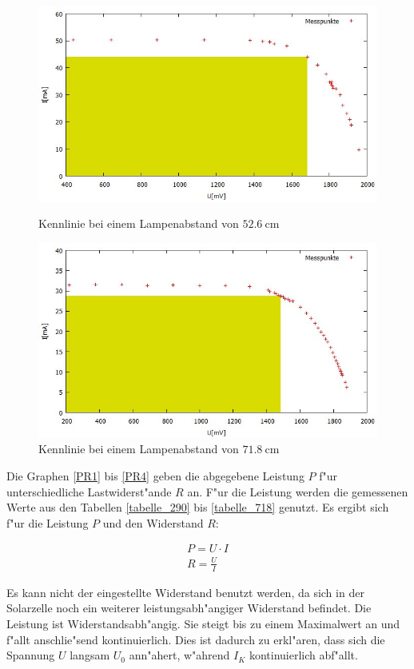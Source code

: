 	\begin{figure}[htbp]
		\centering
		\includegraphics[width = 12cm]{img/526.jpg}
		\caption{Kennlinie bei einem Lampenabstand von $\SI{52.6}{\centi\meter}$}
		\label{UI3}

		\centering
		\includegraphics[width = 12cm]{img/718.jpg}
		\caption{Kennlinie bei einem Lampenabstand von $\SI{71.8}{\centi\meter}$}
		\label{UI4}
	\end{figure}

	Die Graphen \eqref{PR1} bis \eqref{PR4} geben die abgegebene Leistung $P$ f"ur unterschiedliche Lastwiderst"ande $R$ an.
	F"ur die Leistung werden die gemessenen Werte aus den Tabellen \eqref{tabelle_290} bis \eqref{tabelle_718} genutzt.
	Es ergibt sich f"ur die Leistung $P$ und den Widerstand $R$:

	\begin{eqnarray*}
		P = U \cdot I\\
		R = \frac{U}{I}
	\end{eqnarray*}

	Es kann nicht der eingestellte Widerstand benutzt werden, da sich in der Solarzelle noch ein weiterer leistungsabh"angiger Widerstand befindet.
	Die Leistung ist Widerstandsabh"angig.
	Sie steigt bis zu einem Maximalwert an und f"allt anschlie"send kontinuierlich.
	Dies ist dadurch zu erkl"aren, dass sich die Spannung $U$ langsam $U_0$ ann"ahert, w"ahrend $I_K$ kontinuierlich abf"allt.\\

